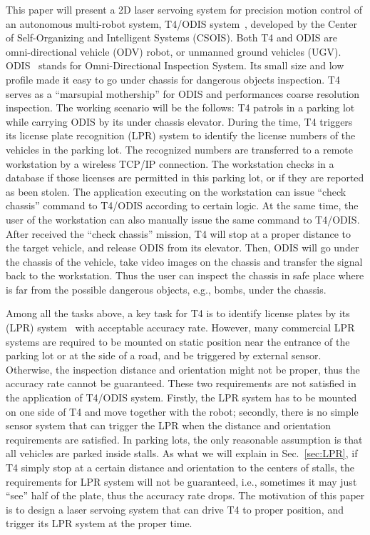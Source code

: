 \documentclass[]{spie}
\newcounter{cmt}
\newcommand{\showcom}{no} %
\newcommand{\com}[1]{\ifthenelse{\equal{\showcom}{yes}}
    { \noindent{\quad\raisebox{0.5em}{\fbox{\stepcounter{cmt} \texttt{\footnotesize Comment \arabic{cmt}}}}}
        \underline{\underline{\textsl{#1}}} \index{Comment List!\arabic{cmt}#1}}
    {}
}
\begin{document}
    This paper will present a 2D laser servoing system for precision motion control of an autonomous multi-robot system, T4/ODIS system~\cite{BahlMultiRobot}, developed by the Center of Self-Organizing and Intelligent Systems (CSOIS). Both T4 and ODIS are omni-directional vehicle (ODV) robot, or unmanned ground vehicles (UGV). ODIS~\cite{odis_spie01} stands for Omni-Directional Inspection System. Its small size and low profile made it easy to go under chassis for dangerous objects inspection. T4 serves as a ``marsupial mothership'' for ODIS and performances coarse resolution inspection. The working scenario will be the follows: T4 patrols in a parking lot while carrying ODIS by its under chassis elevator. During the time, T4 triggers its license plate recognition (LPR) system to identify the license numbers of the vehicles in the parking lot. The recognized numbers are transferred to a remote workstation by a wireless TCP/IP connection. The workstation checks in a database if those licenses are permitted in this parking lot, or if they are reported as been stolen. The application executing on the workstation can issue ``check chassis'' command to T4/ODIS according to certain logic. At the same time, the user of the workstation can also manually issue the same command to T4/ODIS. After received the ``check chassis'' mission, T4 will stop at a proper distance to the target vehicle, and release ODIS from its elevator. Then, ODIS will go under the chassis of the vehicle, take video images on the chassis and transfer the signal back to the workstation. Thus the user can inspect the chassis in safe place where is far from the possible dangerous objects, e.g., bombs, under the chassis.



    Among all the tasks above, a key task for T4 is to identify license plates by its (LPR) system~\cite{HiTech} with acceptable accuracy rate. However, many commercial LPR systems are required to be mounted on static position near the entrance of the parking lot or at the side of a road, and be triggered by external sensor. Otherwise, the inspection distance and orientation might not be proper, thus the accuracy rate cannot be guaranteed. These two requirements are not satisfied in the application of T4/ODIS system. Firstly, the LPR system has to be mounted on one side of T4 and move together with the robot; secondly, there is no simple sensor system that can trigger the LPR when the distance and orientation requirements are satisfied. In parking lots, the only reasonable assumption is that all vehicles are parked inside stalls. As what we will explain in Sec.~\ref{sec:LPR}, if T4 simply stop at a certain distance and orientation to the centers of stalls, the requirements for LPR system will not be guaranteed, i.e., sometimes it may just ``see'' half of the plate, thus the accuracy rate drops. The motivation of this paper is to design a laser servoing system that can drive T4 to proper position, and trigger its LPR system at the proper time.
\end{document}
